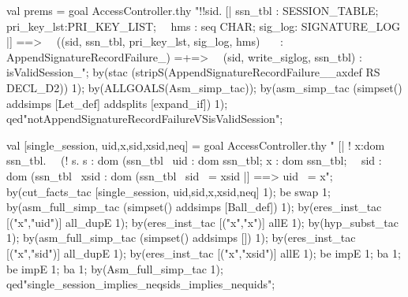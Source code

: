 \documentclass[a4paper,pdftex]{article}
\newenvironment{holz-proof}{\comment}{\endcomment}
\begin{document}
\begin{holz-proof}

val prems = goal AccessController.thy 
"!!sid. [| ssn_tbl : SESSION_TABLE; pri_key_lst:PRI_KEY_LIST;                \
\          hms : seq CHAR; sig_log: SIGNATURE_LOG |] ==>                     \
\       ((sid, ssn_tbl, pri_key_lst, sig_log, hms)                            \
\                   ~: AppendSignatureRecordFailure_)  =+=>                   \
\       (sid, write_siglog, ssn_tbl) : isValidSession_";
by(stac (stripS(AppendSignatureRecordFailure__axdef RS DECL_D2)) 1);
by(ALLGOALS(Asm_simp_tac));
by(asm_simp_tac (simpset() addsimps [Let_def] addsplits [expand_if]) 1);
qed"notAppendSignatureRecordFailureVSisValidSession";


val [single_session, uid,x,sid,xsid,neq] = goal AccessController.thy
" [|  ! x:dom ssn_tbl.                                                    \
\             (! s. s : dom (ssn_tbl %
\     uid : dom ssn_tbl;   x : dom ssn_tbl;                               \
\     sid : dom (ssn_tbl %
\     xsid : dom (ssn_tbl %
\     sid ~= xsid |] ==>   uid ~= x";
by(cut_facts_tac [single_session, uid,sid,x,xsid,neq] 1);
be swap 1;
by(asm_full_simp_tac (simpset() addsimps [Ball_def]) 1);
by(eres_inst_tac [("x","uid")] all_dupE 1);
by(eres_inst_tac [("x","x")] allE 1);
by(hyp_subst_tac 1);
by(asm_full_simp_tac (simpset() addsimps []) 1);
by(eres_inst_tac [("x","sid")] all_dupE 1);
by(eres_inst_tac [("x","xsid")] allE 1);
be impE 1; ba 1;
be impE 1; ba 1;
by(Asm_full_simp_tac 1);
qed"single_session_implies_neqsids_implies_nequids";






\end{holz-proof}
\end{document}
